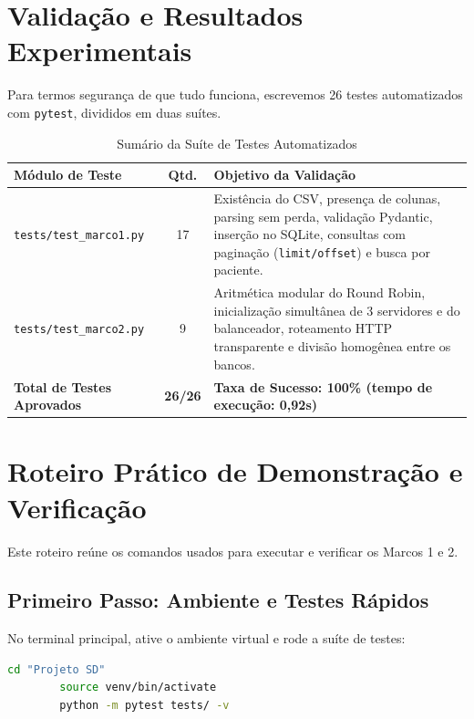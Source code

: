 \documentclass[12pt,a4paper]{article}
\begin{document}
	\section{Validação e Resultados Experimentais}
	
	Para termos segurança de que tudo funciona, escrevemos 26 testes automatizados com \texttt{pytest}, divididos em duas suítes.
	
	\begin{table}[H]
		\centering
		\small
		\caption{Sumário da Suíte de Testes Automatizados}
		\label{tab:testes}
		\begin{tabularx}{\textwidth}{l c X}
			\toprule
			\textbf{Módulo de Teste} & \textbf{Qtd.} & \textbf{Objetivo da Validação} \\
			\midrule
			\texttt{tests/test\_marco1.py} & 17 & Existência do CSV, presença de colunas, parsing sem perda, validação Pydantic, inserção no SQLite, consultas com paginação (\texttt{limit/offset}) e busca por paciente. \\
			\texttt{tests/test\_marco2.py} & 9 & Aritmética modular do Round Robin, inicialização simultânea de 3 servidores e do balanceador, roteamento HTTP transparente e divisão homogênea entre os bancos. \\
			\midrule
			\textbf{Total de Testes Aprovados} & \textbf{26/26} & \textbf{Taxa de Sucesso: 100\% (tempo de execução: 0,92s)} \\
			\bottomrule
		\end{tabularx}
	\end{table}
	
	\section{Roteiro Prático de Demonstração e Verificação}
	\label{sec:roteiro}
	
	Este roteiro reúne os comandos usados para executar e verificar os Marcos 1 e 2.
	
	\subsection{Primeiro Passo: Ambiente e Testes Rápidos}
	No terminal principal, ative o ambiente virtual e rode a suíte de testes:
	\begin{lstlisting}[language=bash]
		cd "Projeto SD"
		source venv/bin/activate
		python -m pytest tests/ -v
	\end{lstlisting}
	
\end{document}
